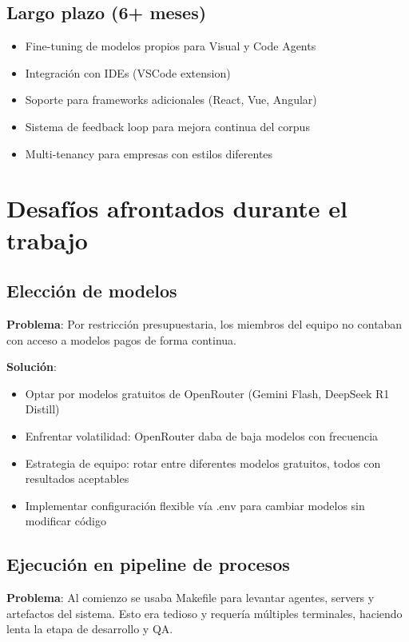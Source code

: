 \documentclass[12pt,a4paper]{article}
\begin{document}
\subsection{Largo plazo (6+ meses)}

\begin{itemize}
    \item Fine-tuning de modelos propios para Visual y Code Agents
    \item Integración con IDEs (VSCode extension)
    \item Soporte para frameworks adicionales (React, Vue, Angular)
    \item Sistema de feedback loop para mejora continua del corpus
    \item Multi-tenancy para empresas con estilos diferentes
\end{itemize}

\section{Desafíos afrontados durante el trabajo}

\subsection{Elección de modelos}

\textbf{Problema}: Por restricción presupuestaria, los miembros del equipo no contaban con acceso a modelos pagos de forma continua.

\textbf{Solución}:
\begin{itemize}
    \item Optar por modelos gratuitos de OpenRouter (Gemini Flash, DeepSeek R1 Distill)
    \item Enfrentar volatilidad: OpenRouter daba de baja modelos con frecuencia
    \item Estrategia de equipo: rotar entre diferentes modelos gratuitos, todos con resultados aceptables
    \item Implementar configuración flexible vía .env para cambiar modelos sin modificar código
\end{itemize}

\subsection{Ejecución en pipeline de procesos}

\textbf{Problema}: Al comienzo se usaba Makefile para levantar agentes, servers y artefactos del sistema. Esto era tedioso y requería múltiples terminales, haciendo lenta la etapa de desarrollo y QA.
\end{document}
